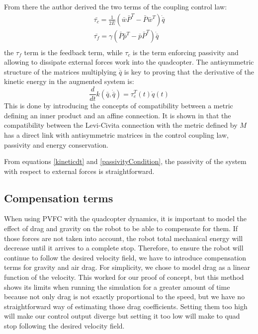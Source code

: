 From there the author derived the two terms of the coupling control law: 
\begin{align}
    \bar{\tau_c} = \frac{1}{2\bar{E}}(\bar{w}\bar{P}^T - \bar{P}\bar{w}^T ) \dot{\bar{q}} \label{tauc}\\
    \bar{\tau_f} = \gamma(\bar{P}\bar{p}^T - \bar{p}\bar{P}^T ) \dot{\bar{q}} \label{tauf}\\
\end{align}
the $\tau_f$ term is the feedback term, while $\tau_c$ is the term enforcing passivity and allowing to dissipate external forces work into the quadcopter.
The antisymmetric structure of the matrices multiplying $\dot{\bar{q}}$ is key to proving that the derivative of the kinetic energy in the augmented system is: 
\begin{equation}
    \frac{d}{dt}k(\bar{q}, \dot{\bar{q}}) = \tau_e^T(t)\dot{q}(t) \label{kineticdt}
\end{equation}
This is done by introducing the concepts of compatibility between a metric defining an inner product and an affine connection. It is shown in \cite{li2001passive} that the compatibility between the Levi-Civita connection with the metric defined by $M$ has a direct link with antisymmetric matrices in the control coupling law, passivity and energy conservation.

From equations \ref{kineticdt} and \ref{passivityCondition}, the passivity of the system with respect to external forces is straightforward.

\subsection{Compensation terms}
When using PVFC with the quadcopter dynamics, it is important to model the effect of drag and gravity on the robot to be able to compensate for them. If those forces are not taken into account, the robot total mechanical energy will decrease until it arrives to a complete stop. 
Therefore, to ensure the robot will continue to follow the desired velocity field, we have to introduce compensation terms for gravity and air drag. 
For simplicity, we chose to model drag as a linear function of the velocity. This worked for our proof of concept, but this method 
shows its limits when running the simulation for a greater amount of time because not only drag is not exactly proportional to the speed, but we have no straightforward way of estimating those drag coefficients.
Setting them too high will make our control output diverge but setting it too low will make to quad stop following the desired velocity field.  
